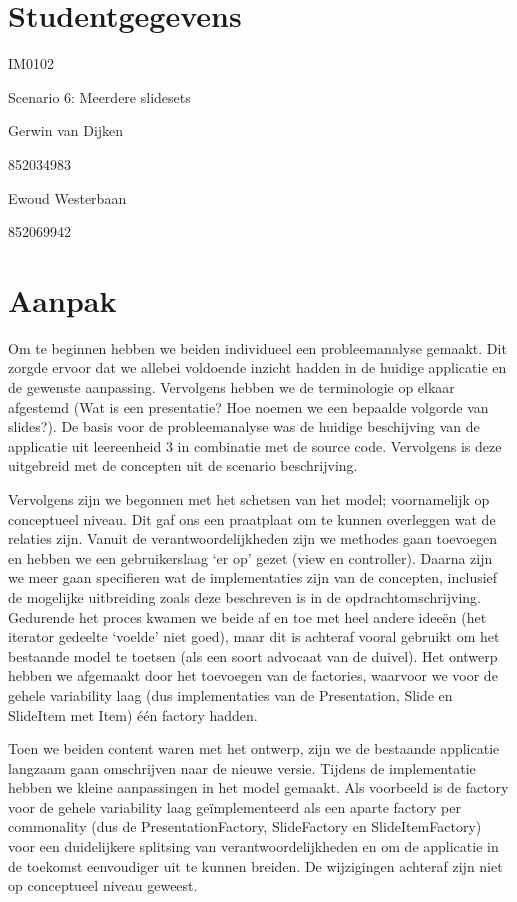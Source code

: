 \documentclass[a4paper]{article}
\begin{document}
\pagestyle{fancy}

\section*{Studentgegevens}
\begin{description}
	\item [Cursuscode] IM0102
	\item Scenario 6: Meerdere slidesets
	\item [Naam] Gerwin van Dijken
	\item [Studentnummer] 852034983
	\item [Naam] Ewoud Westerbaan
	\item [Studentnummer] 852069942
\end{description}

\section*{Aanpak}
Om te beginnen hebben we beiden individueel een probleemanalyse gemaakt. Dit zorgde ervoor dat we allebei voldoende inzicht hadden in de huidige applicatie en de gewenste aanpassing. Vervolgens hebben we de terminologie op elkaar afgestemd (Wat is een presentatie? Hoe noemen we een bepaalde volgorde van slides?). De basis voor de probleemanalyse was de huidige beschijving van de applicatie uit leereenheid 3 in combinatie met de source code. Vervolgens is deze uitgebreid met de concepten uit de scenario beschrijving.
\par
Vervolgens zijn we begonnen met het schetsen van het model; voornamelijk op conceptueel niveau. Dit gaf ons een praatplaat om te kunnen overleggen wat de relaties zijn. Vanuit de verantwoordelijkheden zijn we methodes gaan toevoegen en hebben we een gebruikerslaag `er op' gezet (view en controller). Daarna zijn we meer gaan specifieren wat de implementaties zijn van de concepten, inclusief de mogelijke uitbreiding zoals deze beschreven is in de opdrachtomschrijving. Gedurende het proces kwamen we beide af en toe met heel andere ideeën (het iterator gedeelte `voelde' niet goed), maar dit is achteraf vooral gebruikt om het bestaande model te toetsen (als een soort advocaat van de duivel). Het ontwerp hebben we afgemaakt door het toevoegen van de factories, waarvoor we voor de gehele variability laag (dus implementaties van de Presentation, Slide en SlideItem met Item) één factory hadden. 
\par
Toen we beiden content waren met het ontwerp, zijn we de bestaande applicatie langzaam gaan omschrijven naar de nieuwe versie. Tijdens de implementatie hebben we kleine aanpassingen in het model gemaakt. Als voorbeeld is de factory voor de gehele variability laag geïmplementeerd als een aparte factory per commonality (dus de PresentationFactory, SlideFactory en SlideItemFactory) voor een duidelijkere splitsing van verantwoordelijkheden en om de applicatie in de toekomst eenvoudiger uit te kunnen breiden. De wijzigingen achteraf zijn niet op conceptueel niveau geweest.
\end{document}
